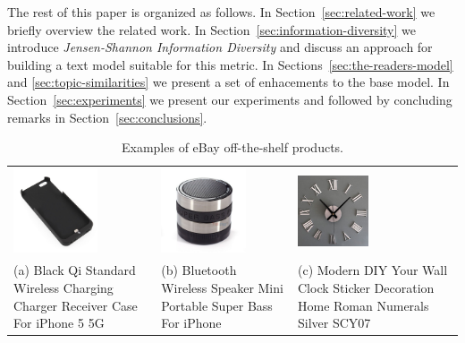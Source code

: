 The rest of this paper is organized as follows. In Section~\ref{sec:related-work} we briefly overview the related work. In Section~\ref{sec:information-diversity} we introduce {\em Jensen-Shannon Information Diversity} and discuss an approach for building a text model suitable for this metric. In Sections~\ref{sec:the-readers-model} and \ref{sec:topic-similarities} we present a set of enhacements to the base model. In Section~\ref{sec:experiments} we present our experiments and followed by concluding remarks in Section~\ref{sec:conclusions}.

\begin{table}[t]
\begin{center}
\begin{tabular}{LLL}
\includegraphics[height=2.5cm]{figures/standard-iphone-case.jpg}&\includegraphics[height=2.5cm]{figures/standard-iphone-speaker.jpg}&\includegraphics[height=2.1cm]{figures/standard-clock.jpg}\\
(a) Black Qi Standard Wireless Charging Charger Receiver Case For iPhone 5 5G & (b) Bluetooth Wireless Speaker Mini Portable Super Bass For iPhone & (c) Modern DIY Your Wall Clock Sticker Decoration Home Roman Numerals Silver SCY07\\
\end{tabular}
\end{center}
\caption{Examples of eBay off-the-shelf products.}
\label{tab:ebay-standard-products}
\end{table}



